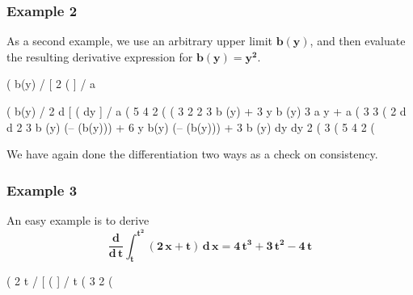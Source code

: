 \documentclass[12pt]{article}
\begin{document}
\subsubsection*{Example 2}  
As a second example, we use an arbitrary upper limit $\mathbf{b(y)}$, and then evaluate the
  resulting derivative expression for $\mathbf{b(y) = y^{2}}$.
\begin{myVerbatim}
(%
                              b(y)
                             /
                             [               2
(%
                             ]
                             /
                              a
\end{myVerbatim}
\newpage
\begin{myVerbatim}
(%
                                                     b(y)
                                                    /
                   2                 d              [
(%
                                     dy             ]
                                                    /
                                                     a
(%
                                  5      4    2
(%
(%
                         3           2         2      3
                        b (y) + 3 y b (y)   3 a  y + a
(%
                                3                3
(%
              2     d                      d               2
           3 b (y) (-- (b(y))) + 6 y b(y) (-- (b(y))) + 3 b (y)
                    dy                     dy                      2
(%
                                    3
(%
                                  5      4    2
(%
\end{myVerbatim} 
We have again done the differentiation two ways as a check on consistency.\\
\subsubsection*{Example 3}
An easy example is to derive 
\begin{equation}
\mathbf{\frac{d}{d\,t} \int_{t}^{t^2} (2\,x+t) \,d\,x = 4\,t^3+3\,t^2 - 4\,t}
\end{equation}
\begin{myVerbatim}
(%
                                 2
                                t
                               /
                               [
(%
                               ]
                               /
                                t
(%
                                  3      2
(%
\end{myVerbatim}
\newpage
\end{document}
